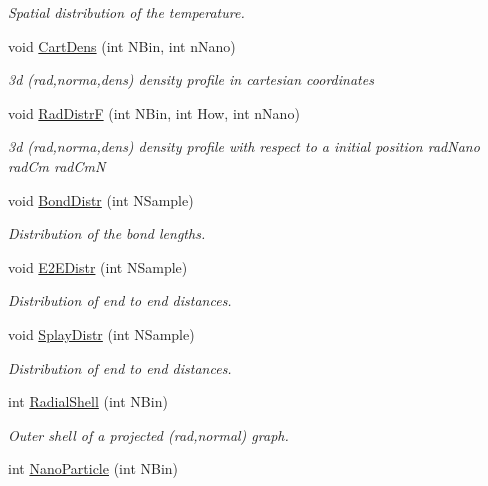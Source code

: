\begin{DoxyCompactItemize}
\begin{DoxyCompactList}\small\item\em \-Spatial distribution of the temperature. \end{DoxyCompactList}\item 
void \hyperlink{classElPoly_ac946a8b29f4eec0816699ce0c0cac23c}{\-Cart\-Dens} (int \-N\-Bin, int n\-Nano)
\begin{DoxyCompactList}\small\item\em 3d (rad,norma,dens) density profile in cartesian coordinates \end{DoxyCompactList}\item 
void \hyperlink{classElPoly_aff852b942203d47f2e21e2616537cbdd}{\-Rad\-Distr\-F} (int \-N\-Bin, int \-How, int n\-Nano)
\begin{DoxyCompactList}\small\item\em 3d (rad,norma,dens) density profile with respect to a initial position  rad\-Nano rad\-Cm rad\-Cm\-N \end{DoxyCompactList}\item 
void \hyperlink{classElPoly_a932a57ab32bd20f60bce8b498ca3095d}{\-Bond\-Distr} (int \-N\-Sample)
\begin{DoxyCompactList}\small\item\em \-Distribution of the bond lengths. \end{DoxyCompactList}\item 
\hypertarget{classElPoly_adac974d49c2d38f45c0227afe7c8fec9}{void \hyperlink{classElPoly_adac974d49c2d38f45c0227afe7c8fec9}{\-E2\-E\-Distr} (int \-N\-Sample)}\label{classElPoly_adac974d49c2d38f45c0227afe7c8fec9}

\begin{DoxyCompactList}\small\item\em \-Distribution of end to end distances. \end{DoxyCompactList}\item 
void \hyperlink{classElPoly_aab448d2a574f63977ddcacb58db616e1}{\-Splay\-Distr} (int \-N\-Sample)
\begin{DoxyCompactList}\small\item\em \-Distribution of end to end distances. \end{DoxyCompactList}\item 
\hypertarget{classElPoly_a64e019ffaa4437477ea433f7b5113341}{int \hyperlink{classElPoly_a64e019ffaa4437477ea433f7b5113341}{\-Radial\-Shell} (int \-N\-Bin)}\label{classElPoly_a64e019ffaa4437477ea433f7b5113341}

\begin{DoxyCompactList}\small\item\em \-Outer shell of a projected (rad,normal) graph. \end{DoxyCompactList}\item 
\hypertarget{classElPoly_af9a89c5f8dc4c7274ec5e00ff4db78bb}{int \hyperlink{classElPoly_af9a89c5f8dc4c7274ec5e00ff4db78bb}{\-Nano\-Particle} (int \-N\-Bin)}\label{classElPoly_af9a89c5f8dc4c7274ec5e00ff4db78bb}


\end{DoxyCompactItemize}
